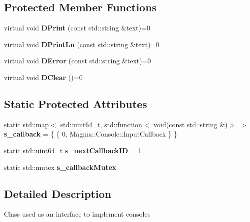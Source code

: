 \subsection*{Protected Member Functions}
\begin{DoxyCompactItemize}
\item 
\mbox{\label{class_magma_1_1_console_a119a54cd773142c5583634cdc10ff4d7}} 
virtual void {\bfseries D\+Print} (const std\+::string \&text)=0
\item 
\mbox{\label{class_magma_1_1_console_ad8ced7621ec1503e8e82edf66e5297ce}} 
virtual void {\bfseries D\+Print\+Ln} (const std\+::string \&text)=0
\item 
\mbox{\label{class_magma_1_1_console_a1d4b23cf878ce761181f3bc1be76c3cd}} 
virtual void {\bfseries D\+Error} (const std\+::string \&text)=0
\item 
\mbox{\label{class_magma_1_1_console_abd509ffc20c8f5ac0f05229de2f48e0d}} 
virtual void {\bfseries D\+Clear} ()=0
\end{DoxyCompactItemize}
\subsection*{Static Protected Attributes}
\begin{DoxyCompactItemize}
\item 
\mbox{\label{class_magma_1_1_console_a84139fb985f2c60a46ba0f273a3e1081}} 
static std\+::map$<$ std\+::uint64\+\_\+t, std\+::function$<$ void(const std\+::string \&)$>$ $>$ {\bfseries s\+\_\+callback} = \{ \{ 0, Magma\+::\+Console\+::\+Input\+Callback \} \}
\item 
\mbox{\label{class_magma_1_1_console_a6f7b7d8347851db498c65ac149f1e024}} 
static std\+::uint64\+\_\+t {\bfseries s\+\_\+next\+Callback\+ID} = 1
\item 
\mbox{\label{class_magma_1_1_console_a35aafe4a576c866ba98fc0d092f4b1e9}} 
static std\+::mutex {\bfseries s\+\_\+callback\+Mutex}
\end{DoxyCompactItemize}


\subsection{Detailed Description}
Class used as an interface to implement consoles 



